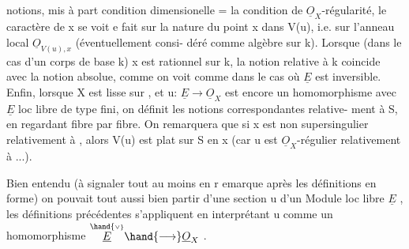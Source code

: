 
notions, mis à part  condition dimensionelle = la condition de
$\underline{O}_X$-régularité, le caractère de x se voit  e fait sur la nature du
point x dans V(u), i.e. sur l'anneau local $\underline{O}_{V(u),x}$ (éventuellement consi-%
déré comme algèbre sur k). Lorsque (dans le cas d'un corps de base k)
x est rationnel sur k, la notion relative à k coincide avec la notion
absolue, comme on voit  comme dans le cas où $\underline{E}$ est inversible. Enfin,
lorsque X est lisse sur , et u: $\underline{E}\to\underline{O}_X$ est encore un homomorphisme avec
$\underline{E}$ loc libre de type fini, on définit les notions correspondantes relative-%
ment à S, en regardant fibre par fibre. On remarquera que si x est
non supersingulier relativement à , alors V(u) est plat sur S  en
x (car u est $\underline{O}_X$-régulier relativement à  ...).

 Bien entendu (à signaler tout au moins en r emarque après les
définitions en forme) on pouvait tout aussi bien partir d'une section u
d'un Module loc libre $\underline{E}$ , les définitions précédentes s'appliquent en
interprétant u comme un homomorphisme $\overset{\hand{\scriptscriptstyle\vee}}{\underline{E}}\hand{\longrightarrow}\underline{O}_X$ .

